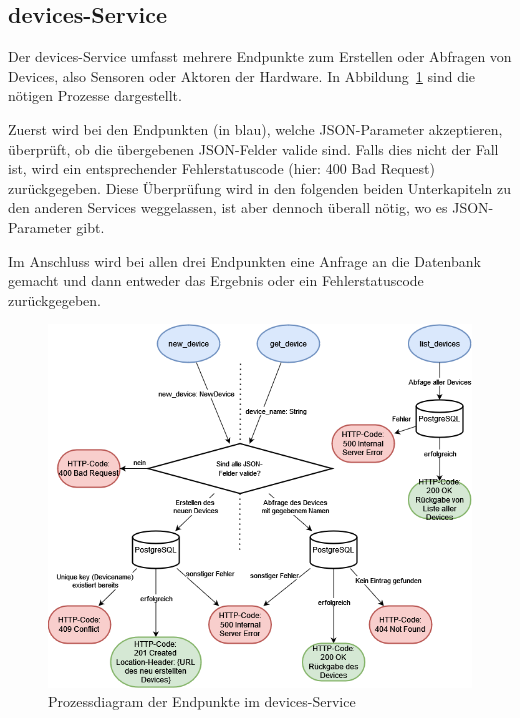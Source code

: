     \subsection{devices-Service}
        Der devices-Service umfasst mehrere Endpunkte zum Erstellen oder Abfragen von Devices, also Sensoren oder Aktoren der Hardware.
        In Abbildung~\ref{fig:backend-service-devices} sind die nötigen Prozesse dargestellt.

        Zuerst wird bei den Endpunkten (in blau), welche JSON-Parameter akzeptieren, überprüft, ob die übergebenen JSON-Felder valide sind.
        Falls dies nicht der Fall ist, wird ein entsprechender Fehlerstatuscode (hier: 400 Bad Request) zurückgegeben.
        Diese Überprüfung wird in den folgenden beiden Unterkapiteln zu den anderen Services weggelassen, ist aber dennoch überall nötig, wo es JSON-Parameter gibt.

        Im Anschluss wird bei allen drei Endpunkten eine Anfrage an die Datenbank gemacht und dann entweder das Ergebnis oder ein Fehlerstatuscode zurückgegeben.

        \begin{figure}[H]
            \includegraphics[width=0.95\linewidth]{images/prozessdiagramm_backend_devices.drawio.png}
            \centering
            \caption{Prozessdiagram der Endpunkte im devices-Service}
            \label{fig:backend-service-devices}
        \end{figure}

